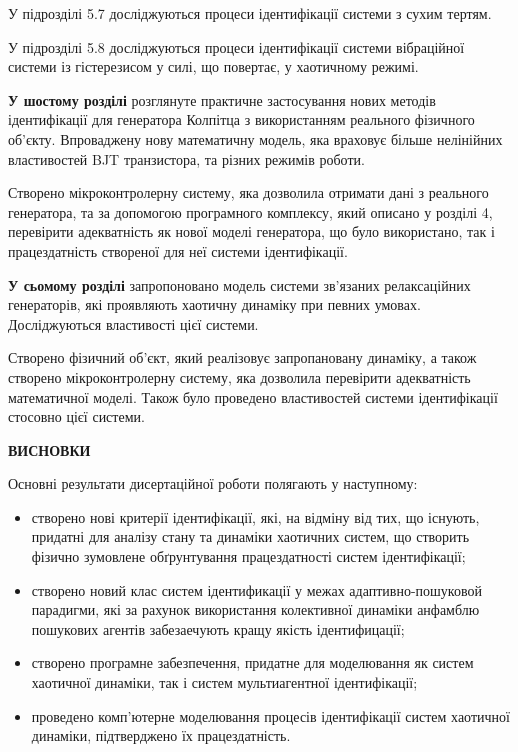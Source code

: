 \documentclass[a4paper,12pt]{atuaref}
\newcommand{\xsect}[1]{\medskip\begin{center}\textbf{#1}\end{center}\medskip\penalty10000}
\begin{document}
У підрозділі 5.7 досліджуються процеси ідентифікації системи з сухим тертям.

У підрозділі 5.8 досліджуються процеси ідентифікації системи  вібраційної системи
із гістерезисом у силі, що повертає, у хаотичному режимі.

\textbf{У шостому розділі}
розглянуте практичне застосування
нових методів ідентифікації для генератора Колпітца
з використанням реального фізичного об'єкту.
Впроваджену нову математичну модель,
яка враховує більше нелінійних властивостей
BJT транзистора, та різних режимів роботи.

Створено мікроконтролерну систему, яка
дозволила отримати дані з реального
генератора, та за допомогою програмного комплексу,
який описано у розділі 4, перевірити адекватність як
нової моделі генератора, що було використано,
так і працездатність створеної для неї системи ідентифікації.



\textbf{У сьомому розділі}
запропоновано модель
системи зв'язаних релаксаційних генераторів,
які проявляють хаотичну динаміку при певних умовах.
Досліджуються  властивості цієї системи.

Створено фізичний об'єкт,
який реалізовує запропановану динаміку,
а також
створено мікроконтролерну систему, яка
дозволила перевірити адекватність математичної моделі.
Також було проведено властивостей системи ідентифікації стосовно цієї системи.

\xsect{ВИСНОВКИ}

Основні результати дисертаційної роботи полягають у наступному:

\begin{itemize}

  \item
  створено нові критерії ідентифікації, які, на відміну від тих, що
  існують, придатні для аналізу стану та динаміки
  хаотичних систем, що створить фізично зумовлене обґрунтування працездатності систем
  ідентифікації;

  \item
  створено новий клас систем ідентификації у межах
    адаптивно-пошуковой парадигми,
    які за рахунок використання колективної динаміки
    анфамблю пошукових агентів забезаечують
    кращу якість ідентифицації;

  \item
  створено програмне забезпечення, придатне для моделювання як систем
  хаотичної динаміки, так і систем мультиагентної ідентифікації;

  \item
  проведено комп'ютерне моделювання процесів ідентифікації систем
  хаотичної динаміки, підтверджено їх працездатність.


\end{itemize}
\end{document}
